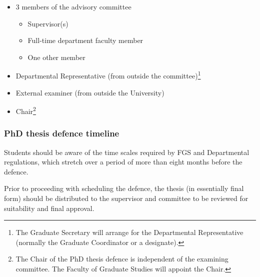 \documentclass[12pt]{article}
\begin{document}
\begin{itemize}

\item 3 members of the advisory committee

    \begin{itemize}

        \item Supervisor(s)

        \item Full-time department faculty member

        \item One other member

    \end{itemize}

\item Departmental Representative (from outside the committee)\footnote{The
    Graduate Secretary will arrange for the Departmental Representative
        (normally the Graduate Coordinator or a designate).}

\item External examiner (from outside the University)

    \item Chair\footnote{The Chair of the PhD thesis defence is independent of the
        examining committee. The Faculty of Graduate Studies will appoint the Chair.}

\end{itemize}


\subsubsection{PhD thesis defence timeline}

Students should be aware of the time scales required by FGS and Departmental
regulations, which stretch over a period of more than eight months before the
defence.

Prior to proceeding with scheduling the defence, the thesis (in essentially
final form) should be distributed to the supervisor and committee to be
reviewed for suitability and final approval.
\end{document}
